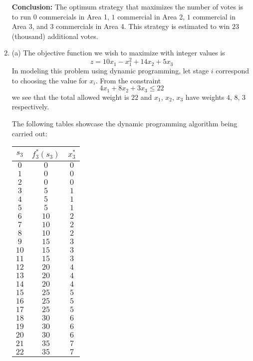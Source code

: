 \documentclass{article}[12pt,a4paper]
\begin{document}
\begin{enumerate}
  \textbf{Conclusion:}
  The optimum strategy that maximizes the number of votes is to run $0$ commercials in Area 1, $1$ commercial in Area 2,
  $1$ commercial in Area 3, and $3$ commercials in Area 4. This strategy is estimated to win $23$ (thousand) additional votes.
  
  \pagebreak
  \item
  
  (a) 
  The objective function we wish to maximize with integer values is
  $$z = 10x_1 - x_1^2 + 14x_2 + 5x_3$$
  In modeling this problem using dynamic programming, let stage $i$
  correspond to choosing the value for $x_i$.
  From the constraint
  $$4x_1 + 8x_2 + 3x_3 \le 22$$
  we see that the total allowed weight is $22$ and $x_1$, $x_2$, $x_3$
  have weights $4$, $8$, $3$ respectively.
  
  The following tables showcase the dynamic programming algorithm being carried out:

  
  \begin{multicols}{2}
  
  \begin{tabular}{c | c | c}
  $s_3$ & $f_3^*(s_3)$ & $x_3^*$ \\
  \hline
  $0$ & $0$ & $0$ \\
  $1$ & $0$ & $0$ \\
  $2$ & $0$ & $0$ \\
  $3$ & $5$ & $1$ \\
  $4$ & $5$ & $1$ \\
  $5$ & $5$ & $1$ \\
  $6$ & $10$ & $2$ \\
  $7$ & $10$ & $2$ \\
  $8$ & $10$ & $2$ \\
  $9$ & $15$ & $3$ \\
  $10$ & $15$ & $3$ \\
  $11$ & $15$ & $3$ \\
  $12$ & $20$ & $4$ \\
  $13$ & $20$ & $4$ \\
  $14$ & $20$ & $4$ \\
  $15$ & $25$ & $5$ \\
  $16$ & $25$ & $5$ \\
  $17$ & $25$ & $5$ \\
  $18$ & $30$ & $6$ \\
  $19$ & $30$ & $6$ \\
  $20$ & $30$ & $6$ \\
  $21$ & $35$ & $7$ \\
  $22$ & $35$ & $7$ \\
  \end{tabular}
  

\end{multicols}
\end{enumerate}
\end{document}
